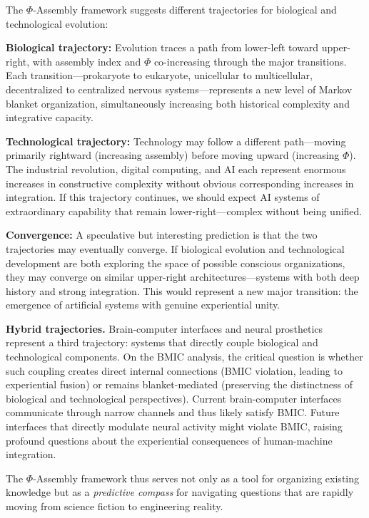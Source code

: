 \documentclass[11pt,a4paper]{article}
\theoremstyle{definition}
\theoremstyle{plain}
\theoremstyle{remark}
\begin{document}
The $\Phi$-Assembly framework suggests different trajectories for biological and technological evolution:

\textbf{Biological trajectory:} Evolution traces a path from lower-left toward upper-right, with assembly index and $\Phi$ co-increasing through the major transitions. Each transition---prokaryote to eukaryote, unicellular to multicellular, decentralized to centralized nervous systems---represents a new level of Markov blanket organization, simultaneously increasing both historical complexity and integrative capacity.

\textbf{Technological trajectory:} Technology may follow a different path---moving primarily rightward (increasing assembly) before moving upward (increasing $\Phi$). The industrial revolution, digital computing, and AI each represent enormous increases in constructive complexity without obvious corresponding increases in integration. If this trajectory continues, we should expect AI systems of extraordinary capability that remain lower-right---complex without being unified.

\textbf{Convergence:} A speculative but interesting prediction is that the two trajectories may eventually converge. If biological evolution and technological development are both exploring the space of possible conscious organizations, they may converge on similar upper-right architectures---systems with both deep history and strong integration. This would represent a new major transition: the emergence of artificial systems with genuine experiential unity.

\textbf{Hybrid trajectories.} Brain-computer interfaces and neural prosthetics represent a third trajectory: systems that directly couple biological and technological components. On the BMIC analysis, the critical question is whether such coupling creates direct internal connections (BMIC violation, leading to experiential fusion) or remains blanket-mediated (preserving the distinctness of biological and technological perspectives). Current brain-computer interfaces communicate through narrow channels and thus likely satisfy BMIC. Future interfaces that directly modulate neural activity might violate BMIC, raising profound questions about the experiential consequences of human-machine integration.

The $\Phi$-Assembly framework thus serves not only as a tool for organizing existing knowledge but as a \textit{predictive compass} for navigating questions that are rapidly moving from science fiction to engineering reality.
\end{document}
